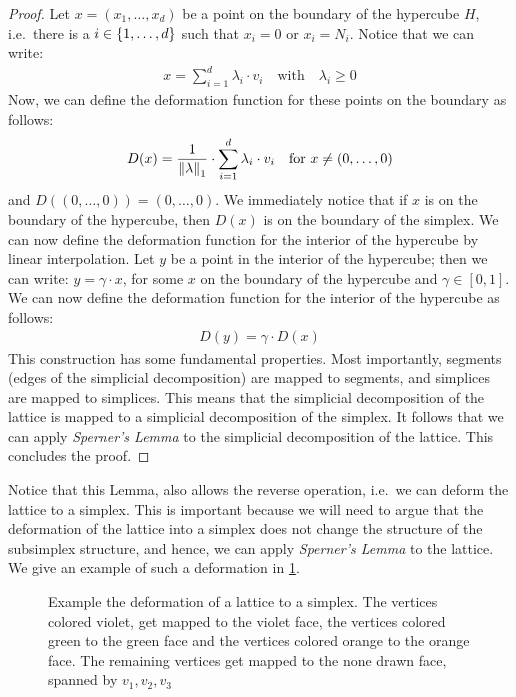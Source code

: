 \begin{proof}
	Let $x = (x_1, \dots, x_d)$ be a point on the boundary of the hypercube $H$, i.e.\ there is a $i \in \left\{1, \dots, d\right\}$ such that $x_i = 0$ or $x_i = N_i$. Notice that we can write:
	\begin{align*}
		x = \sum_{i=1}^{d} \lambda_i \cdot v_i \quad \text{with} \quad \lambda_i \geq 0
	\end{align*}
	Now, we can define the deformation function for these points on the boundary as follows:
	\begin{align*}
		D(x) = \frac{1}{\left\lVert\lambda\right\rVert_1} \cdot \sum_{i=1}^{d} \lambda_i \cdot v_i \quad \text{for $x \neq (0, \dots, 0)$}
	\end{align*}
	and $D((0, \dots, 0)) = (0, \dots, 0)$. We immediately notice that if $x$ is on the boundary of the hypercube, then $D(x)$ is on the boundary of the simplex. We can now define the deformation function for the interior of the hypercube by linear interpolation. Let $y$ be a point in the interior of the hypercube; then we can write: $y = \gamma \cdot x$, for some $x$ on the boundary of the hypercube and $\gamma \in [0, 1]$. We can now define the deformation function for the interior of the hypercube as follows:
	\begin{align*}
		D(y) = \gamma \cdot D(x)
	\end{align*}
	This construction has some fundamental properties. Most importantly, segments (edges of the simplicial decomposition) are mapped to segments, and simplices are mapped to simplices. This means that the simplicial decomposition of the lattice is mapped to a simplicial decomposition of the simplex. It follows that we can apply \textit{Sperner's Lemma} to the simplicial decomposition of the lattice. This concludes the proof.
\end{proof}

Notice that this Lemma, also allows the reverse operation, i.e.\ we can deform the lattice to a simplex. This is important because we will need to argue that the deformation of the lattice into a simplex does not change the structure of the subsimplex structure, and hence, we can apply \textit{Sperner's Lemma} to the lattice. We give an example of such a deformation in \cref{fig:sperner_lattice_example}.

\begin{figure}
	\centering
	{\Large{}}
	\caption[Example the deformation of a lattice to a simplex]{Example the deformation of a lattice to a simplex. The vertices colored violet, get mapped to the violet face, the vertices colored green to the green face and the vertices colored orange to the orange face. The remaining vertices get mapped to the none drawn face, spanned by $v_1, v_2, v_3$}\label{fig:sperner_lattice_example}
\end{figure}


